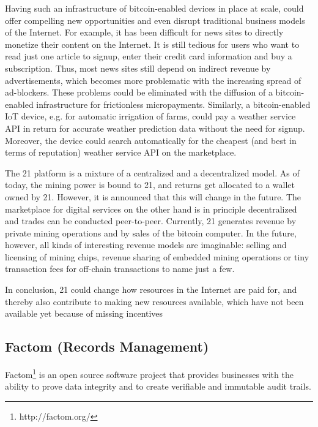 Having such an infrastructure of bitcoin-enabled devices in place at scale, could 
offer compelling new opportunities and even disrupt traditional business models 
of the Internet. For example, it has been difficult for news sites to directly 
monetize their content on the Internet. It is still tedious for users who want 
to read just one article to signup, enter their credit card information and buy 
a subscription. Thus, most news sites still depend on indirect revenue by advertisements, 
which becomes more problematic with the increasing spread of ad-blockers. These 
problems could be eliminated with the diffusion of a bitcoin-enabled infrastructure 
for frictionless micropayments. Similarly, a bitcoin-enabled IoT device, e.g. for 
automatic irrigation of farms, could pay a weather service API in return for accurate 
weather prediction data without the need for signup. Moreover, the device could 
search automatically for the cheapest (and best in terms of reputation) weather 
service API on the marketplace.

The 21 platform is a mixture of a centralized and a decentralized model. As of 
today, the mining power is bound to 21, and returns get allocated to a wallet owned 
by 21. However, it is announced that this will change in the future. The marketplace 
for digital services on the other hand is in principle decentralized and trades 
can be conducted peer-to-peer. Currently, 21 generates revenue by private mining 
operations and by sales of the bitcoin computer. In the future, however, all kinds 
of interesting revenue models are imaginable: selling and licensing of mining chips, 
revenue sharing of embedded mining operations or tiny transaction fees for off-chain 
transactions to name just a few. 

In conclusion, 21 could change how resources in the Internet are paid for, and 
thereby also contribute to making new resources available, which have not been 
available yet because of missing incentives

\subsection{Factom (Records Management)}
\label{sec:ecofactom}

Factom\footnote{http://factom.org/} is an open source software project that provides businesses with 
the ability to prove data integrity and to create verifiable and immutable audit 
trails. 

